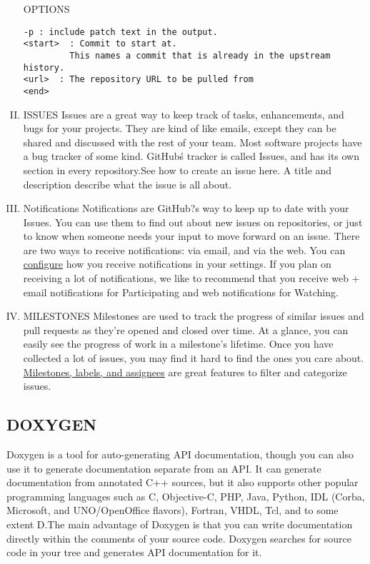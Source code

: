 \documentclass[11pt,utf8]{article}
\begin{document}
\begin{enumerate}[I.]
OPTIONS
\begin{lstlisting} 
-p : include patch text in the output.
<start>  : Commit to start at. 
         This names a commit that is already in the upstream history.
<url>  : The repository URL to be pulled from
<end>
\end{lstlisting}
\item ISSUES
Issues are a great way to keep track of tasks, enhancements, and bugs for your projects. They are kind of like emails, except they can be shared and discussed with the rest of your team. Most software projects have a bug tracker of some kind. GitHub\'s tracker is called Issues, and has its own section in every repository.See how to create an issue here. A title and description describe what the issue is all about.

\item Notifications
Notifications are GitHub?s way to keep up to date with your Issues. You can use them to find out about new issues on repositories, or just to know when someone needs your input to move forward on an issue. There are two ways to receive notifications: via email, and via the web. You can \href{https://help.github.com/articles/configuring-notification-emails/}{configure} how you receive notifications in your settings. If you plan on receiving a lot of notifications, we like to recommend that you receive web + email notifications for Participating and web notifications for Watching.

\item MILESTONES
Milestones are used to track the progress of similar issues and pull requests as they're opened and closed over time. At a glance, you can easily see the progress of work in a milestone's lifetime. Once you have collected a lot of issues, you may find it hard to find the ones you care about. \href{https://guides.github.com/features/issues/}{Milestones, labels, and assignees} are great features to filter and categorize issues.
 \end {enumerate}



\subsection{DOXYGEN}
Doxygen is a tool for auto-generating API documentation, though you can also use it to generate documentation separate from an API. It can generate documentation from annotated C++ sources, but it also supports other popular programming languages such as C, Objective-C, PHP, Java, Python, IDL (Corba, Microsoft, and UNO/OpenOffice flavors), Fortran, VHDL, Tcl, and to some extent D.The main advantage of Doxygen is that you can write documentation directly within the comments of your source code. Doxygen searches for source code in your tree and generates API documentation for it.
\end{document}
